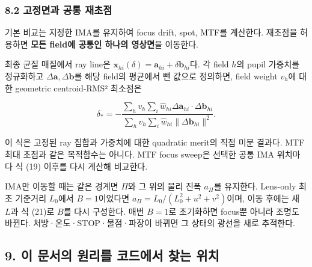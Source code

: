 \documentclass[
  a4paper,
]{article}
\begin{document}
\hypertarget{uxace0uxc815uxba74uxacfc-uxacf5uxd1b5-uxc7acuxcd08uxc810}{%
\subsubsection{8.2 고정면과 공통
재초점}\label{uxace0uxc815uxba74uxacfc-uxacf5uxd1b5-uxc7acuxcd08uxc810}}

기본 비교는 지정한 IMA를 유지하여 focus drift, spot, MTF를 계산한다.
재초점을 허용하면 \textbf{모든 field에 공통인 하나의 영상면}을 이동한다.

최종 균질 매질에서 ray line은
\(\mathbf x_{hi}(\delta)=\mathbf a_{hi}+\delta\mathbf b_{hi}\)다. 각
field \(h\)의 pupil 가중치를 정규화하고
\(\Delta\mathbf a,\Delta\mathbf b\)를 해당 field의 평균에서 뺀 값으로
정의하면, field weight \(v_h\)에 대한 geometric centroid-RMS² 최소점은

\[
\delta_*=-\frac{\sum_hv_h\sum_i\widehat w_{hi}
 \Delta\mathbf a_{hi}\cdot\Delta\mathbf b_{hi}}
 {\sum_hv_h\sum_i\widehat w_{hi}\|\Delta\mathbf b_{hi}\|^2}.
\tag{44}
\]

이 식은 고정된 ray 집합과 가중치에 대한 quadratic merit의 직접 미분
결과다. MTF 최대 초점과 같은 목적함수는 아니다. MTF focus sweep은 선택한
공통 IMA 위치마다 식 (19) 이후를 다시 계산해 비교한다.

IMA만 이동할 때는 같은 경계면 \(\Pi\)와 그 위의 물리 진폭 \(a_\Pi\)를
유지한다. Lens-only 최초 기준거리 \(L_0\)에서 \(B=1\)이었다면
\(a_\Pi=L_0/(L_0^2+u^2+v^2)\)이며, 이동 후에는 새 \(L\)과 식 (21)로
\(B\)를 다시 구성한다. 매번 \(B=1\)로 초기화하면 focus뿐 아니라 조명도
바뀐다. 처방·온도·STOP·물점·파장이 바뀌면 그 상태의 광선을 새로
추적한다.

\hypertarget{uxc774-uxbb38uxc11cuxc758-uxc6d0uxb9acuxb97c-uxcf54uxb4dcuxc5d0uxc11c-uxcc3euxb294-uxc704uxce58}{%
\subsection{9. 이 문서의 원리를 코드에서 찾는
위치}\label{uxc774-uxbb38uxc11cuxc758-uxc6d0uxb9acuxb97c-uxcf54uxb4dcuxc5d0uxc11c-uxcc3euxb294-uxc704uxce58}}
\end{document}
